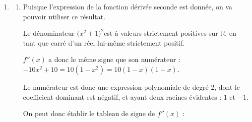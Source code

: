 \documentclass[10pt]{article}
\providecommand{\R}{\mathbb{R}}
\begin{document}
\begin{enumerate}
\begin{enumerate}
Le signe de $f'(x)$ est donc celui du trinôme :\quad $-3x^2 + 10x - 3$.

Ce trinôme a un coefficient dominant égal à $-3$, donc négatif. Cela signifie que toutes les images \quad $-3x^2 + 10x - 3$ \quad sont négatives, sauf pour les valeurs $x$ comprises entre d'éventuelles racines.

Le discriminant du trinôme est :\quad $\Delta = 10^2 - 4\times (-3) \times (-3) = 100 - 36 = 64 = 8^2$.

Comme il est strictement positif, le trinôme admet deux racines réelles distinctes :

$x_1 = \dfrac{-10 - 8}{2\times (-3)} = 3$\quad et \quad  $x_2 = \dfrac{-10 + 8}{2\times (-3)} = \dfrac{1}{3}$.

On peut donc établir le tableau de signe suivant :

\hfill~\hfill~

On a donc une fonction $f$ qui est strictement décroissante sur l'intervalle $\left]-\infty ; \dfrac{1}{3}\right]$, ainsi que sur l'intervalle $[3 ; +\infty[$ et strictement croissante sur l'intervalle $\left[\dfrac{1}{3} ; 3\right] $.

Ceci est cohérent avec la courbe tracée sur le sujet.
		\end{enumerate}
\item 
	\begin{enumerate}
		\item Puisque l'expression de la fonction dérivée seconde est donnée, on va pouvoir utiliser ce résultat.

Le dénominateur \quad $\big(x^2 + 1\big)^2$\quad est à valeurs strictement positives sur $\R$, en tant que carré d'un réel lui-même strictement positif.

$f''(x)$ a donc le même signe que son numérateur :\quad $-10x^2 + 10 = 10(1 - x^2) = 10(1 - x)(1 + x)$.

Le numérateur est donc une expression polynomiale de degré 2, dont le coefficient dominant est négatif, et ayant deux racines évidentes : 1 et $-1$.

On peut donc établir le tableau de signe de $f''(x)$ :

\hfill~\hfill~


\end{enumerate}
\end{enumerate}
\end{document}
